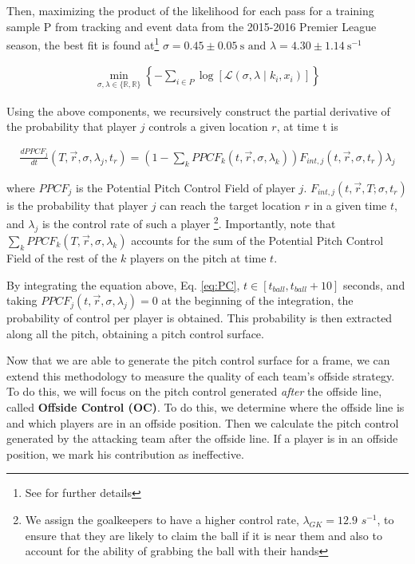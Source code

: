 \documentclass[
  10pt,
  twoside,nohyper]{book}
\begin{document}
Then, maximizing the product of the likelihood for each pass for a training sample P from tracking and event data from the 2015-2016 Premier League season, the best fit is found at\footnote{See \autocite{SpearmanFit} for further details} \(\sigma=0.45 \pm 0.05 \mathrm{~s} \text { and } \lambda=4.30 \pm 1.14 \mathrm{~s}^{-1}\)

\begin{align*}
\min _{\sigma, \lambda \in\{\mathbb{R}, \mathbb{R}\}}\left\{-\sum_{i \in P} \log \left[\mathcal{L}\left(\sigma, \lambda \mid k_i, x_i\right)\right]\right\}
\end{align*}

Using the above components, we recursively construct the partial derivative of the probability that player \(j\) controls a given location \(r\), at time t is

\begin{align}
\frac{d P P C F_j}{d t}\left(T, \vec{r} , \sigma, \lambda_j, t_r\right)=\left(1-\sum_k P P C F_k\left(t, \vec{r} , \sigma, \lambda_k\right)\right) F_{int,j}(t, \vec{r}  , \sigma, t_r) \lambda_j
\label{eq:PC}
\end{align}

where \(PPCF_j\) is the Potential Pitch Control Field of player \(j\). \(F_{int,j}(t, \vec{r}, T ; \sigma, t_r)\) is the probability that player \(j\) can reach the target location \(r\) in a given time \(t\), and \(\lambda_j\) is the control rate of such a player \footnote{We assign the goalkeepers to have a higher control rate, \(\lambda_{GK} = 12.9\) \(s^{-1}\), to ensure that they are likely to claim the ball if it is near them and also to account for the ability of grabbing the ball with their hands}. Importantly, note that \(\sum_k P P C F_k\left(T, \vec{r} , \sigma, \lambda_k\right)\) accounts for the sum of the Potential Pitch Control Field of the rest of the \(k\) players on the pitch at time \(t\).

By integrating the equation above, Eq. \eqref{eq:PC}, \(t \in \left[ t_{ball},t_{ball} + 10 \right]\) seconds, and taking \(P P C F_j\left(t, \vec{r} , \sigma, \lambda_j\right) = 0\) at the beginning of the integration, the probability of control per player is obtained. This probability is then extracted along all the pitch, obtaining a pitch control surface.

Now that we are able to generate the pitch control surface for a frame, we can extend this methodology to measure the quality of each team's offside strategy. To do this, we will focus on the pitch control generated \emph{after} the offside line, called \textbf{Offside Control (OC)}. To do this, we determine where the offside line is and which players are in an offside position. Then we calculate the pitch control generated by the attacking team after the offside line. If a player is in an offside position, we mark his contribution as ineffective.
\end{document}
